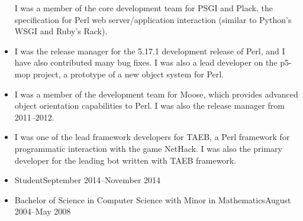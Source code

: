 \documentclass[letterpaper]{article}
\begin{document}
\begin{itemize}
        I was a member of the core development team for PSGI and Plack, the
        specification for Perl web server/application interaction (similar to
        Python's WSGI and Ruby's Rack).
    \item {} \linebreak \linebreak
        I was the release manager for the 5.17.1 development release of Perl,
        and I have also contributed many bug fixes. I was also a lead developer
        on the p5-mop project, a prototype of a new object system for Perl.
    \item {} \linebreak \linebreak
        I was a member of the development team for Moose, which provides
        advanced object orientation capabilities to Perl. I was also the
        release manager from 2011--2012.
    \item {} \linebreak \linebreak
        I was one of the lead framework developers for TAEB, a Perl framework
        for programmatic interaction with the game NetHack. I was also the
        primary developer for the leading bot written with TAEB framework.
\end{itemize}
\begin{itemize}
    \item {}
                        {Student}{September 2014--November 2014}
    \item {}
                        {Bachelor of Science in Computer Science with Minor in Mathematics}{August 2004--May 2008}
        \begin{minipage}[t]{\textwidth/2-0.2in}
            \begin{itemize}
                \vspace{-7pt}
                \vspace{4pt}
            \end{itemize}
        \end{minipage}
        \begin{minipage}[t]{\textwidth/2-0.2in}
            \begin{itemize}
                \vspace{-7pt}
                \vspace{4pt}
            \end{itemize}
        \end{minipage}
\end{itemize}
\end{document}
